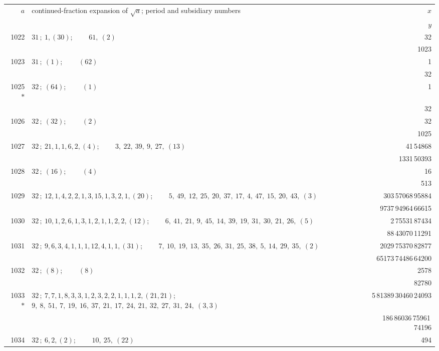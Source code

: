 \documentclass[11pt]{article}
\providecommand{\asterism}{*}
\begin{document}
\renewcommand{\arraystretch}{1.15}
\begin{longtable}{|r|p{}|r|}
\hline
$a$ & continued-fraction expansion of $\sqrt{a}$; period and subsidiary numbers & $x$ \\
 & & $y$ \\
\hline
\endhead
1022 & $31\,;\ 1, (30)$; \ \ \ \ $61,\ (2)$ & 32 \\
 & & 1023 \\
\hline
1023 & $31\,;\ (1)$; \ \ \ \ $(62)$ & 1 \\
 & & 32 \\
\hline
1025$\asterism$ & $32\,;\ (64)$; \ \ \ \ $(1)$ & 1 \\
 & & 32 \\
\hline
1026 & $32\,;\ (32)$; \ \ \ \ $(2)$ & 32 \\
 & & 1025 \\
\hline
1027 & $32\,;\ 21, 1, 1, 6, 2, (4)$; \ \ \ \ $3,\ 22,\ 39,\ 9,\ 27,\ (13)$ & 41\,54868 \\
 & & 1331\,50393 \\
\hline
1028 & $32\,;\ (16)$; \ \ \ \ $(4)$ & 16 \\
 & & 513 \\
\hline
1029 & $32\,;\ 12, 1, 4, 2, 2, 1, 3, 15, 1, 3, 2, 1, (20)$; \ \ \ \ $5,\ 49,\ 12,\ 25,\ 20,\ 37,\ 17,\ 4,\ 47,\ 15,\ 20,\ 43,\ (3)$ & 303\,57068\,95884 \\
 & & 9737\,94964\,66615 \\
\hline
1030 & $32\,;\ 10, 1, 2, 6, 1, 3, 1, 2, 1, 1, 2, 2, (12)$; \ \ \ \ $6,\ 41,\ 21,\ 9,\ 45,\ 14,\ 39,\ 19,\ 31,\ 30,\ 21,\ 26,\ (5)$ & 2\,75531\,87434 \\
 & & 88\,43070\,11291 \\
\hline
1031 & $32\,;\ 9, 6, 3, 4, 1, 1, 1, 12, 4, 1, 1, (31)$; \ \ \ \ $7,\ 10,\ 19,\ 13,\ 35,\ 26,\ 31,\ 25,\ 38,\ 5,\ 14,\ 29,\ 35,\ (2)$ & 2029\,75370\,82877 \\
 & & 65173\,74486\,64200 \\
\hline
1032 & $32\,;\ (8)$; \ \ \ \ $(8)$ & 2578 \\
 & & 82780 \\
\hline
1033$\asterism$ & $32\,;\ 7, 7, 1, 8, 3, 3, 1, 2, 3, 2, 2, 1, 1, 1, 2, (21, 21)$; \ \ \ \ $9,\ 8,\ 51,\ 7,\ 19,\ 16,\ 37,\ 21,\ 17,\ 24,\ 21,\ 32,\ 27,\ 31,\ 24,\ (3, 3)$ & 5\,81389\,30460\,24093 \\
 & & 186\,86036\,75961\,74196 \\
\hline
1034 & $32\,;\ 6, 2, (2)$; \ \ \ \ $10,\ 25,\ (22)$ & 494 \\

\end{longtable}
\end{document}
